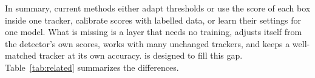 In summary, current methods either adapt thresholds or use the score of each
box inside one tracker, calibrate scores with labelled data, or learn their
settings for one model. What is missing is a layer that needs no training, adjusts itself
from the detector's own scores, works with many unchanged trackers, and keeps
a well-matched tracker at its own accuracy. \scl{} is designed to fill this
gap. Table~\ref{tab:related} summarizes the differences.


